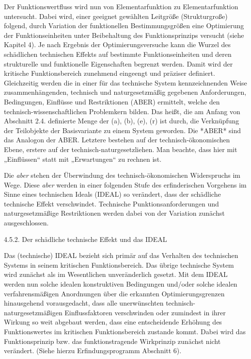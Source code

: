 \documentclass[12pt,a4paper]{article}
\begin{document}
Der Funktionswertfluss wird nun von Elementarfunktion zu Elementarfunktion
untersucht. Dabei wird, einer geeignet gewählten Leitgröße (Strukturgroße)
folgend, durch Variation der funktionellen Bestimmungsgrößen eine Optimierung
der Funktionseinheiten unter Beibehaltung des Funktionsprinzips versucht
(siehe Kapitel 4). Je nach Ergebnis der Optimierungsversuche kann die Wurzel
des schädlichen technischen Effekts auf bestimmte Funktionseinheiten und deren
strukturelle und funktionelle Eigenschaften begrenzt werden. Damit wird der
kritische Funktionsbereich zunehmend eingeengt und präziser
definiert. Gleichzeitig werden die in einer für das technische System
kennzeichnenden Weise zusammenhängenden, technisch und naturgesetzmäßig
gegebenen Anforderungen, Bedingungen, Einflüsse und Restriktionen (ABER)
ermittelt, welche den technisch-wissenschaftlichen Problemkern bilden. Das
heißt, die am Anfang von Abschnitt 2.4. definierte Menge der (a), (b), (e),
(r) ist durch, die Verknüpfung der Teilobjekte der Basisvariante zu einem
System geworden. Die *ABER* sind das Analogon der ABER. Letztere bestehen auf
der technisch-ökonomischen Ebene, erstere auf der
technisch-naturgesetzliehen. Man beachte, dass hier mit „Einflüssen“ statt mit
„Erwartungen“ zu rechnen ist.

Die \emph{aber} stehen der Überwindung des technisch-ökonomischen Widerspruchs
im Wege. Diese \emph{aber} werden in einer folgenden Stufe des erfinderischen
Vorgehens im Sinne eines technischen Ideals (IDEAL) so verändert, dass der
schädliche technische Effekt verschwindet. Technische Punktionsanforderungen
und naturgesetzmäßige Restriktionen werden dabei von der Variation zunächst
ausgeschlossen.


4.5.2.  Der schädliche technische Effekt und das IDEAL

Das (technische) IDEAL bezieht sich primär auf das Verhalten des technischen
Systems in seinem kritischen Funktionsbereich. Das übrige technische System
wird zunächst als im Wesentlichen unveränderlich gesetzt. Mit dem IDEAL werden
nun solche idealen konstruktiven Bedingungen und/oder solche idealen
verfahrensmäßigen Anordnungen über die erkannten Optimierungsgrenzen
hinausgehend vorausgedacht, dass alle unerwünschten
technisch-naturgesetzmäßigen Einflussfaktoren verschwinden oder zumindest in
ihrer Wirkung so weit abgebaut werden, dass eine entscheidende Erhöhung des
Funktionswertes im kritischen Funktionsbereich zustande kommt. Dabei wird das
Funktionsprinzip bzw. das funktionstragende Wirkprinzip zunächst nicht
verändert. (Siehe hierzu Erfindungsprogramm Abschnitt 6).
\end{document}
